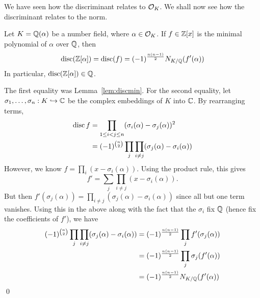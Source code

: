 We have seen how the discriminant relates to $\mathcal{O}_K$. We shall now see how the discriminant relates to the norm.

\begin{lem}\label{lem:discnorm}
Let $K=\mathbb{Q}(\alpha)$ be a number field, where $\alpha \in \mathcal{O}_K$. If $f \in \mathbb{Z}[x]$ is the minimal polynomial of $\alpha$ over $\mathbb{Q}$, then	
	\[
	\operatorname{disc}(\mathbb{Z}[\alpha])= \operatorname{disc}(f)= (-1)^{\frac{n(n-1)}{2}} N_{K/\mathbb{Q}}(f'(\alpha))
	\]
In particular, $\operatorname{disc}(\mathbb{Z}[\alpha]) \in \mathbb{Q}$. 
\end{lem}

\pf The first equality was Lemma~\ref{lem:discmin}. For the second equality, let $\sigma_1,\ldots,\sigma_n: K \hookrightarrow \mathbb{C}$ be the complex embeddings of $K$ into $\mathbb{C}$. By rearranging terms,
	\[
	\begin{split}
	\operatorname{disc} f&= \prod_{1 \leq i < j \leq n} (\sigma_i(\alpha) - \sigma_j(\alpha))^2 \\
	&= (-1)^{\binom{n}{2}} \prod_j \prod_{i \neq j} (\sigma_j(\alpha) - \sigma_i(\alpha))
	\end{split}
	\]
However, we know $f=\prod_i (x - \sigma_i(\alpha))$. Using the product rule, this gives 
	\[
	f'= \sum_j \prod_{i \neq j} (x - \sigma_i(\alpha)).
	\]
But then $f'(\sigma_j(\alpha))= \prod_{i \neq j} (\sigma_j(\alpha) - \sigma_i(\alpha))$ since all but one term vanishes. Using this in the above along with the fact that the $\sigma_i$ fix $\mathbb{Q}$ (hence fix the coefficients of $f'$), we have
	\[
	\begin{split}
	(-1)^{\binom{n}{2}} \prod_j \prod_{i \neq j} (\sigma_j(\alpha) - \sigma_i(\alpha))&= (-1)^{\frac{n(n-1)}{2}} \prod_j f'(\sigma_j(\alpha)) \\
	&= (-1)^{\frac{n(n-1)}{2}} \prod_j \sigma_j(f'(\alpha)) \\
	&=  (-1)^{\frac{n(n-1)}{2}} N_{K/\mathbb{Q}}(f'(\alpha))
	\end{split}
	\] \qed \\

